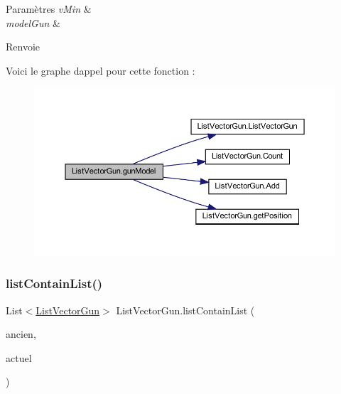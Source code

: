 \begin{DoxyParams}{Paramètres}
{\em v\+Min} & \\
\hline
{\em model\+Gun} & \\
\hline
\end{DoxyParams}
\begin{DoxyReturn}{Renvoie}

\end{DoxyReturn}
Voici le graphe d\textquotesingle{}appel pour cette fonction \+:
\nopagebreak
\begin{figure}[H]
\begin{center}
\leavevmode
\includegraphics[width=350pt]{class_list_vector_gun_a1c5fc4ed92b846e08616d83971605241_cgraph}
\end{center}
\end{figure}
\mbox{\label{class_list_vector_gun_a73d0b1fca681bce5aaf680873b071827}} 
\subsubsection{\texorpdfstring{list\+Contain\+List()}{listContainList()}}
{\footnotesize\ttfamily List$<$\mbox{\hyperlink{class_list_vector_gun}{List\+Vector\+Gun}}$>$ List\+Vector\+Gun.\+list\+Contain\+List (\begin{DoxyParamCaption}\item[{List$<$ \mbox{\hyperlink{class_list_vector_gun}{List\+Vector\+Gun}} $>$}]{ancien,  }\item[{List$<$ \mbox{\hyperlink{class_list_vector_gun}{List\+Vector\+Gun}} $>$}]{actuel }\end{DoxyParamCaption})\hspace{0.3cm}{\ttfamily [inline]}}



